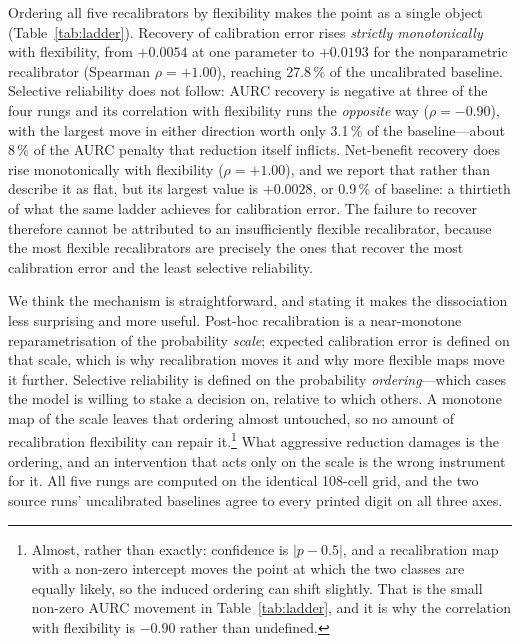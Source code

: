 \documentclass[fleqn,10pt]{wlscirep}
\newcommand{\result}[1]{#1}
\begin{document}
Ordering all five recalibrators by flexibility makes the point as a single object
(Table~\ref{tab:ladder}). Recovery of calibration error rises \emph{strictly monotonically} with
flexibility, from \result{$+0.0054$} at one parameter to \result{$+0.0193$} for the nonparametric
recalibrator (Spearman \result{$\rho=+1.00$}), reaching \result{27.8\,\%} of the uncalibrated
baseline. Selective reliability does not follow: AURC recovery is negative at three of the four rungs
and its correlation with flexibility runs the \emph{opposite} way (\result{$\rho=-0.90$}), with the
largest move in either direction worth only \result{3.1\,\%} of the baseline---about
\result{8\,\%} of the AURC penalty that reduction itself inflicts. Net-benefit recovery does rise
monotonically with flexibility (\result{$\rho=+1.00$}), and we report that rather than describe it as
flat, but its largest value is \result{$+0.0028$}, or \result{0.9\,\%} of baseline: a thirtieth of
what the same ladder achieves for calibration error. The failure to recover therefore cannot be
attributed to an insufficiently flexible recalibrator, because the most flexible recalibrators are
precisely the ones that recover the most calibration error and the least selective reliability.

We think the mechanism is straightforward, and stating it makes the dissociation less surprising and
more useful. Post-hoc recalibration is a near-monotone reparametrisation of the probability
\emph{scale}; expected calibration error is defined on that scale, which is why recalibration moves it
and why more flexible maps move it further. Selective reliability is defined on the probability
\emph{ordering}---which cases the model is willing to stake a decision on, relative to which others.
A monotone map of the scale leaves that ordering almost untouched, so no amount of recalibration
flexibility can repair it.\footnote{Almost, rather than exactly: confidence is $|p-0.5|$, and a
recalibration map with a non-zero intercept moves the point at which the two classes are equally
likely, so the induced ordering can shift slightly. That is the small non-zero AURC movement in
Table~\ref{tab:ladder}, and it is why the correlation with flexibility is \result{$-0.90$} rather than
undefined.} What aggressive reduction damages is the ordering, and an intervention that acts only on
the scale is the wrong instrument for it. All five rungs are computed on the identical
\result{108}-cell grid, and the two source runs' uncalibrated baselines agree to every printed digit
on all three axes.
\end{document}
